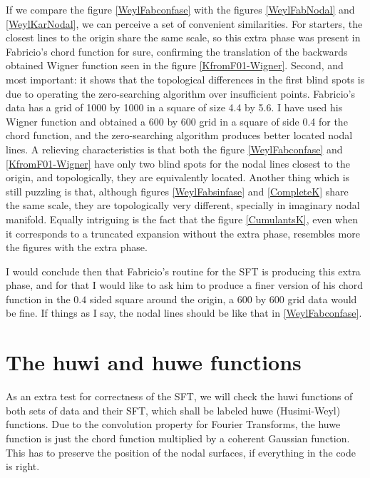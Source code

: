 \documentclass[a4paper,12pt]{article}
\begin{document}
If we compare the figure \ref{WeylFabconfase} with the figures \ref{WeylFabNodal}
and \ref{WeylKarNodal}, we can perceive a set of convenient similarities.  For
starters, the closest lines to the origin share the same scale, so this extra phase
was present in Fabricio's chord function for sure, confirming the translation
of the backwards obtained Wigner function seen in the figure \ref{KfromF01-Wigner}. 
Second, and most important: it shows that the topological differences
in the first blind spots is due to operating the zero-searching algorithm over
insufficient points. Fabricio's data has  a grid of 1000 by 1000 in a square of
size 4.4 by 5.6. I have used his Wigner function and obtained a 600 by 600 grid
in a square of side 0.4 for the chord function, and the zero-searching algorithm
produces better located nodal lines. A relieving characteristics is that both the figure
\ref{WeylFabconfase} and \ref{KfromF01-Wigner} have only two blind spots for the nodal
lines closest to the origin, and topologically, they are equivalently located. 
Another thing which is still puzzling is that, although figures \ref{WeylFabsinfase}
and \ref{CompleteK} share the same scale, they are topologically very different,
specially in imaginary nodal manifold. Equally intriguing is the fact that 
the figure \ref{CumulantsK}, even when it corresponds to a truncated 
expansion without the extra phase, resembles more
the figures with the extra phase.

I would conclude then that Fabricio's routine for the SFT is producing this
extra phase, and for that I would like to ask him to produce a finer version of
his chord function in the $0.4$ sided square around the origin, a 600 by 600
grid data would be fine. If things as I say, the nodal lines should
be like that in \ref{WeylFabconfase}. 



\section{The huwi and huwe functions}

As an extra test for correctness of the SFT, we will check the huwi functions
of both sets of data and their SFT, which shall be labeled huwe (Husimi-Weyl) 
functions. Due to the convolution property for  Fourier Transforms, the
huwe function is just the chord function multiplied by a coherent Gaussian function.
This has to preserve the position of the nodal surfaces, if everything in the code is
right.
\end{document}

